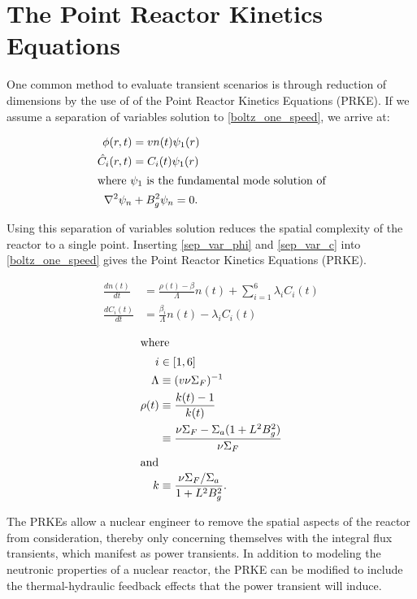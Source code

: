 \documentclass[12pt]{article}
\begin{document}
\section{The Point Reactor Kinetics Equations}

One common method to evaluate transient scenarios is through reduction of
dimensions by the use of of the Point Reactor Kinetics Equations (PRKE). If we assume a separation of variables solution  to \eqref{boltz_one_speed}, we
arrive at:

\begin{align}
  \phi(r,t) &= vn(t)\psi_1(r) \label{sep_var_phi}\\
  \hat{C}_i(r,t) &= C_i(t)\psi_1(r) \label{sep_var_c}\\
  \intertext{where $\psi_1$ is the fundamental mode solution of}
  \nabla^2\psi_n &+ B_g^2\psi_n = 0.
\end{align}

Using this separation of variables solution reduces the spatial complexity of
the reactor to a single point. Inserting \eqref{sep_var_phi} and
\eqref{sep_var_c} into \eqref{boltz_one_speed} gives the Point Reactor Kinetics Equations (PRKE).

\begin{align}
  \frac{dn(t)}{dt} &= \frac{\rho(t)-\beta}{\Lambda}n(t) + \sum_{i=1}^{6}\lambda_iC_i(t)\\
  \frac{dC_i(t)}{dt} &= \frac{\beta_i}{\Lambda}n(t) - \lambda_i C_i(t)
  \label{prke}
\end{align}

\begin{align}
  \intertext{where}
  i&\in[1,6]\nonumber\\
  \Lambda&\equiv (v\nu\Sigma_F)^{-1}\nonumber\\
  \rho(t) &\equiv\frac{k(t)-1}{k(t)}\nonumber\\
         &\equiv\frac{\nu\Sigma_F-\Sigma_a(1+L^2B_g^2)}{\nu\Sigma_F}\nonumber\\
  \intertext{and}
  k&\equiv \frac{\nu\Sigma_F/\Sigma_a}{1+L^2B_g^2}.\nonumber
\end{align}

The PRKEs allow a nuclear engineer to remove the spatial aspects of the
reactor from consideration, thereby only concerning themselves with the integral
flux transients, which manifest as power transients.  In addition to modeling
the neutronic properties of a nuclear reactor, the PRKE can be modified to
include the thermal-hydraulic feedback effects that the power transient will
induce.
\end{document}
